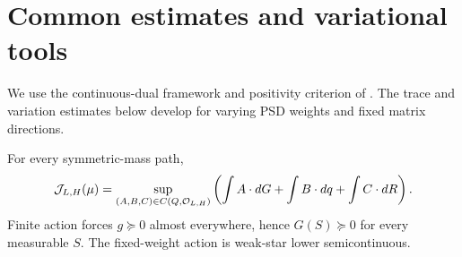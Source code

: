 \section{Common estimates and variational tools}\label{sec:tools}
We use the continuous-dual framework and positivity criterion of
\cite[Lemma 3.3 and Appendix A]{LiZou}. The trace and variation estimates
below develop \cite[Lemma 3.12 and Proposition 3.13]{LiZou} for varying PSD
weights and fixed matrix directions.

\begin{lemma}\label{lem:duality}
For every symmetric-mass path,
\begin{equation}\label{eq:continuousdual}
 \mathcal J_{L,H}(\mu)=
 \sup_{(A,B,C)\in C(Q,\mathcal O_{L,H})}
 \left(\int A\cdot dG+\int B\cdot dq+\int C\cdot dR\right).
\end{equation}
Finite action forces $g\succeq0$ almost everywhere, hence $G(S)\succeq0$
for every measurable $S$. The fixed-weight action is weak-star lower
semicontinuous.
\end{lemma}
